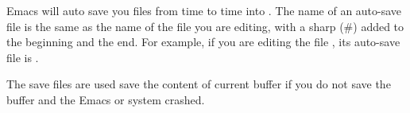 Emacs will auto save you files from time to time into .
The name of an auto-save file is the same as the name of the file you are editing, with a sharp (\#) added to the beginning and the end.
For example, if you are editing the file , its auto-save file is .

The save files are used save the content of current buffer if you do not save the buffer and the Emacs or system crashed.









